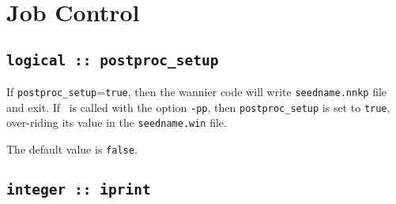 %
%
%
%

\section{Job Control}

\subsection[postproc\_setup]{\tt logical :: postproc\_setup}
If \verb#postproc_setup#=\verb#true#, then the wannier code will write
 {\tt seedname.nnkp} file and exit.
If \wannier\ is called with the option {\tt -pp}, then
 \verb#postproc_setup# is set to
\verb#true#, over-riding its
value in the {\tt seedname.win} file.

The default value is \verb#false#.


%


\subsection[iprint]{\tt integer :: iprint}

